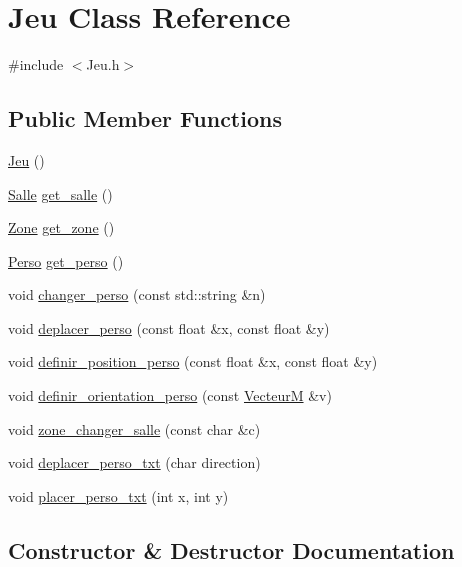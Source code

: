 \hypertarget{classJeu}{}\section{Jeu Class Reference}
\label{classJeu}


{\ttfamily \#include $<$Jeu.\+h$>$}

\subsection*{Public Member Functions}
\begin{DoxyCompactItemize}
\item 
\hyperlink{classJeu_acc5795ee00edf75516d3dfe65be3e6d6}{Jeu} ()
\item 
\hyperlink{classSalle}{Salle} \hyperlink{classJeu_abef357abf8752aa3bbd887d3d02d39b5}{get\+\_\+salle} ()
\item 
\hyperlink{classZone}{Zone} \hyperlink{classJeu_ad039e51fea7f4831f1f7461bdad20854}{get\+\_\+zone} ()
\item 
\hyperlink{classPerso}{Perso} \hyperlink{classJeu_a1a13f300078c5c38d402937f7bee40e5}{get\+\_\+perso} ()
\item 
void \hyperlink{classJeu_a86ed39a8b3d080a3e38f03034e9ce734}{changer\+\_\+perso} (const std\+::string \&n)
\item 
void \hyperlink{classJeu_af53414a64fbed782135517c6244baa19}{deplacer\+\_\+perso} (const float \&x, const float \&y)
\item 
void \hyperlink{classJeu_ad515ef604f0ca6eed7a48592e26213b8}{definir\+\_\+position\+\_\+perso} (const float \&x, const float \&y)
\item 
void \hyperlink{classJeu_a356c3f60c1fba1d16bce98013eefe443}{definir\+\_\+orientation\+\_\+perso} (const \hyperlink{classVecteurM}{VecteurM} \&v)
\item 
void \hyperlink{classJeu_a967e55cb872d8f570ad85dfc526692da}{zone\+\_\+changer\+\_\+salle} (const char \&c)
\item 
void \hyperlink{classJeu_a355402f932a5b99ee80c702948e632a5}{deplacer\+\_\+perso\+\_\+txt} (char direction)
\item 
void \hyperlink{classJeu_a56b2057832a6b7aa9535299131fb653e}{placer\+\_\+perso\+\_\+txt} (int x, int y)
\end{DoxyCompactItemize}


\subsection{Constructor \& Destructor Documentation}
